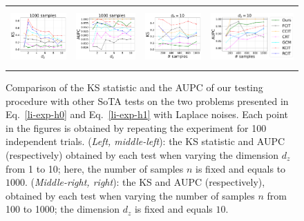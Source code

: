 \begin{figure}[h]
\begin{tabular}{cccc} 
\includegraphics[height=2.2cm]{sections/appendix/independence_testing_kernel/new_figures_lap/nsamples_fixed_1000_li_dim_1_10_ks.pdf}& \includegraphics[height=2.2cm]{sections/appendix/independence_testing_kernel/new_figures_lap/nsamples_fixed_1000_li_dim_1_10_aupc.pdf} & 
\includegraphics[height=2.2cm]{sections/appendix/independence_testing_kernel/new_figures_lap/dim_fixed_10_li_ks.pdf}& \includegraphics[height=2.2cm]{sections/appendix/independence_testing_kernel/new_figures_lap/dim_fixed_10_li_aupc.pdf} 
\end{tabular}
\caption{Comparison of the KS statistic and the AUPC of our testing procedure with other SoTA tests on the two problems presented in Eq.~\eqref{li-exp-h0} and Eq.~\eqref{li-exp-h1}  with Laplace noises. Each point in the figures is obtained by repeating the experiment for 100 independent trials. (\emph{Left, middle-left}): the KS statistic and AUPC (respectively) obtained by each test when varying the dimension $d_z$ from 1 to 10; here, the number of samples $n$ is fixed and equals to $1000$. (\emph{Middle-right, right}): the KS and AUPC (respectively), obtained by each test when varying the number of samples $n$ from 100 to 1000; the dimension $d_z$ is fixed and equals $10$.
\label{fig-exp-li-ks-laplace-supp}}
\vspace{-0.5cm}
\end{figure}


